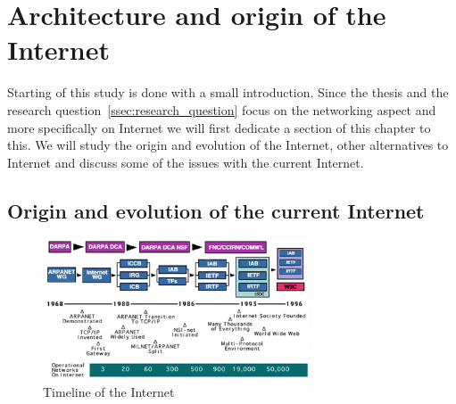 \section{Architecture and origin of the Internet}

Starting of this study is done with a small introduction. Since the thesis and the research question~\ref{ssec:research_question} focus on the networking aspect and more specifically on Internet we will first dedicate a section of this chapter to this. We will study the origin and evolution of the Internet, other alternatives to Internet and discuss some of the issues with the current Internet. 

\subsection{Origin and evolution of the current Internet}

\begin{figure}[H]
    \centering
    \includegraphics[width=0.7\textwidth]{figures/Internettimeline}
    \caption{Timeline of the Internet \citep{website:Internethistory}} 
    \label{fig:Internettimeline}
\end{figure}
\npar


